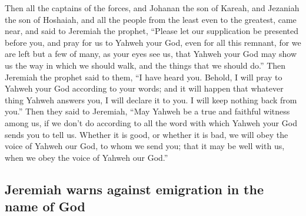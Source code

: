  Then all the captains of the forces, and Johanan the son
of Kareah, and Jezaniah the son of Hoshaiah, and all the people from the
least even to the greatest, came near,  and said to
Jeremiah the prophet, ``Please let our supplication be presented before
you, and pray for us to Yahweh your God, even for all this remnant, for
we are left but a few of many, as your eyes see us,  that
Yahweh your God may show us the way in which we should walk, and the
things that we should do.''  Then Jeremiah the prophet
said to them, ``I have heard you. Behold, I will pray to Yahweh your God
according to your words; and it will happen that whatever thing Yahweh
answers you, I will declare it to you. I will keep nothing back from
you.''  Then they said to Jeremiah, ``May Yahweh be a true
and faithful witness among us, if we don't do according to all the word
with which Yahweh your God sends you to tell us.  Whether
it is good, or whether it is bad, we will obey the voice of Yahweh our
God, to whom we send you; that it may be well with us, when we obey the
voice of Yahweh our God.''

\hypertarget{jeremiah-warns-against-emigration-in-the-name-of-god}{%
\subsection{Jeremiah warns against emigration in the name of
God}\label{jeremiah-warns-against-emigration-in-the-name-of-god}}


